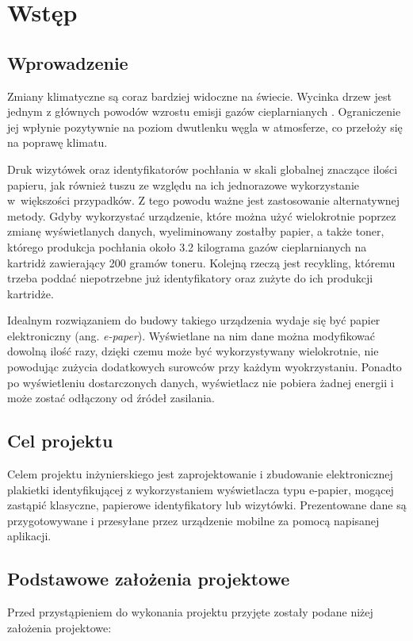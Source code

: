\documentclass[a4paper,12pt, twoside]{article}
\begin{document}
    	\section{Wstęp}
    	
    	\subsection{Wprowadzenie}
    	Zmiany klimatyczne są coraz bardziej widoczne na świecie. Wycinka drzew jest jednym z głównych powodów wzrostu emisji gazów cieplarnianych \cite{clima_causes}. Ograniczenie jej wpłynie pozytywnie na poziom dwutlenku węgla w atmosferze, co przełoży się na poprawę klimatu. 
    	
    	Druk wizytówek oraz identyfikatorów pochłania w skali globalnej znaczące ilości papieru, jak również tuszu ze względu na ich jednorazowe wykorzystanie w~większości przypadków. Z tego powodu ważne jest zastosowanie alternatywnej metody. Gdyby wykorzystać urządzenie, które można użyć wielokrotnie poprzez zmianę wyświetlanych danych, wyeliminowany zostałby papier, a także toner, którego produkcja pochłania około 3.2 kilograma gazów cieplarnianych \cite{cartidge_production} na kartridż zawierający 200 gramów toneru. Kolejną rzeczą jest recykling, któremu trzeba poddać niepotrzebne już identyfikatory oraz zużyte do ich produkcji kartridże.
    	
    	Idealnym rozwiązaniem do budowy takiego urządzenia wydaje się być papier elektroniczny (ang. \textit{e-paper}). Wyświetlane na nim dane można modyfikować dowolną ilość razy, dzięki czemu może być wykorzystywany wielokrotnie, nie powodując zużycia dodatkowych surowców przy każdym wyokrzystaniu. Ponadto po wyświetleniu dostarczonych danych, wyświetlacz nie pobiera żadnej energii i może zostać odłączony od źródeł zasilania.

    	\subsection{Cel projektu}
    	Celem projektu inżynierskiego jest zaprojektowanie i zbudowanie elektronicznej plakietki identyfikującej z wykorzystaniem wyświetlacza typu e-papier, mogącej zastąpić klasyczne, papierowe identyfikatory lub wizytówki. Prezentowane dane są przygotowywane i przesyłane przez urządzenie mobilne za pomocą napisanej aplikacji.

    	\subsection{Podstawowe założenia projektowe}
    	Przed przystąpieniem do wykonania projektu przyjęte zostały podane niżej założenia projektowe:
    	
\end{document}
